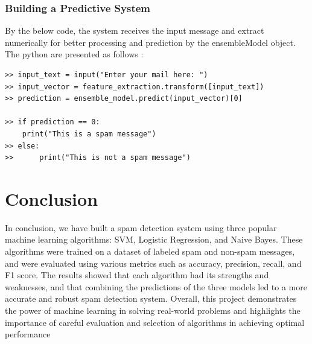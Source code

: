 \documentclass[12pt,a4paper]{article}
\begin{document}
\section{Building a Predictive System}
By the below code, the system receives the input message and extract numerically for better processing and prediction by the ensembleModel object. The python are presented as follows : 
\begin{verbatim}
>> input_text = input("Enter your mail here: ")
>> input_vector = feature_extraction.transform([input_text])
>> prediction = ensemble_model.predict(input_vector)[0]

>> if prediction == 0:
	print("This is a spam message")
>> else:
>>      print("This is not a spam message")
\end{verbatim}

\part{Conclusion}
In conclusion, we have built a spam detection system using three popular machine learning algorithms: SVM, Logistic Regression, and Naive Bayes. These algorithms were trained on a dataset of labeled spam and non-spam messages, and were evaluated using various metrics such as accuracy, precision, recall, and F1 score. The results showed that each algorithm had its strengths and weaknesses, and that combining the predictions of the three models led to a more accurate and robust spam detection system. Overall, this project demonstrates the power of machine learning in solving real-world problems and highlights the importance of careful evaluation and selection of algorithms in achieving optimal performance

\newpage


\end{document}

